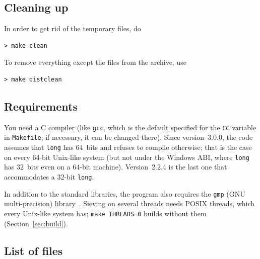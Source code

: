 \documentclass[12pt,a4paper,oneside]{amsart}
\begin{document}
\subsection{Cleaning up}

In order to get rid of the temporary files, do

\begin{verbatim}
> make clean
\end{verbatim}

To remove everything except the files from the archive, use

\begin{verbatim}
> make distclean
\end{verbatim}

\subsection{Requirements}

You need a C compiler (like \texttt{gcc}, which is the default specified
for the \texttt{CC} variable in \texttt{Makefile}; if necessary, it can be
changed there). Since version~3.0.0, the code assumes that \texttt{long} has
64~bits and refuses to compile otherwise; that is the case on every 64-bit
Unix-like system (but not under the Windows ABI, where \texttt{long} has
32~bits even on a 64-bit machine). Version~2.2.4 is the last one that
accommodates a 32-bit \texttt{long}.

In addition to the standard libraries, the program also requires the
\texttt{gmp} (GNU multi-precision) library~\cite{gmp}. Sieving on several
threads needs POSIX threads, which every Unix-like system has;
\texttt{make THREADS=0} builds without them (Section~\ref{sec:build}).

\subsection{List of files}
\end{document}
